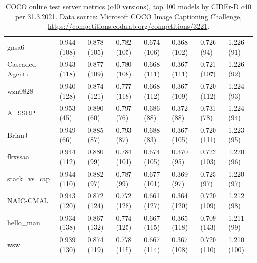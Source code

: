\documentclass[english,twoside,openright]{HYgraduMLDS}
\begin{document}
\begin{appendices}
\begin{longtable}{l|l|l|l|l|l|l|l}
gnsa6 & 0.944 (108) & 0.878 (105) & 0.782 (105) & 0.674 (106) & 0.368 (102) & 0.726 (94) & 1.226 (91) \\
Cascaded-Agents & 0.943 (118) & 0.877 (109) & 0.780 (108) & 0.668 (111) & 0.367 (111) & 0.721 (107) & 1.226 (92) \\
wzn0828 & 0.940 (128) & 0.874 (121) & 0.777 (118) & 0.668 (112) & 0.367 (109) & 0.720 (112) & 1.224 (93) \\
A\_SSRP & 0.953 (45) & 0.890 (60) & 0.797 (76) & 0.686 (88) & 0.372 (88) & 0.731 (78) & 1.224 (94) \\
BrianJ & 0.949 (66) & 0.885 (87) & 0.793 (87) & 0.688 (83) & 0.367 (105) & 0.720 (111) & 1.223 (95) \\
fkxssaa & 0.944 (112) & 0.880 (99) & 0.784 (101) & 0.674 (105) & 0.370 (95) & 0.722 (103) & 1.220 (96) \\
stack\_vs\_cap & 0.944 (110) & 0.882 (97) & 0.787 (99) & 0.677 (101) & 0.369 (97) & 0.725 (97) & 1.220 (97) \\
NAIC-CMAL & 0.943 (120) & 0.872 (124) & 0.772 (128) & 0.661 (127) & 0.364 (120) & 0.720 (109) & 1.212 (98) \\
hello\_man & 0.934 (138) & 0.867 (132) & 0.774 (125) & 0.667 (115) & 0.365 (118) & 0.709 (143) & 1.211 (99) \\
wsw & 0.939 (130) & 0.874 (119) & 0.778 (115) & 0.667 (114) & 0.367 (108) & 0.720 (110) & 1.210 (100) \\

\caption{COCO online test server metrics (c40 versions), top 100 models by CIDEr-D c40 per 31.3.2021. Data source: Microsoft COCO Image Captioning Challenge, \url{https://competitions.codalab.org/competitions/3221}.}
\label{table:COCOresults}
\end{longtable}

\end{appendices}
\end{document}
